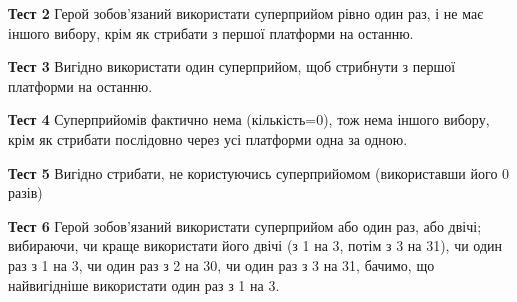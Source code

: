 {\bf Тест 2} Герой зобов’язаний використати суперприйом рівно один раз, і не має іншого вибору, крім як стрибати з першої платформи на останню.

{\bf Тест 3} Вигідно використати один суперприйом, щоб стрибнути з першої платформи на останню.

{\bf Тест 4} Суперприйомів фактично нема (кількість=0), тож нема іншого вибору, крім як стрибати послідовно через усі платформи одна за одною.

{\bf Тест 5} Вигідно стрибати, не користуючись суперприйомом (використавши його 0 разів)

{\bf Тест 6} Герой зобов’язаний використати суперприйом або один раз, або двічі; вибираючи, чи краще використати його двічі (з 1 на 3, потім з 3 на 31), чи один раз з 1 на 3, чи один раз з 2 на 30, чи один раз з 3 на 31, бачимо, що найвигідніше використати один раз з 1 на 3.

